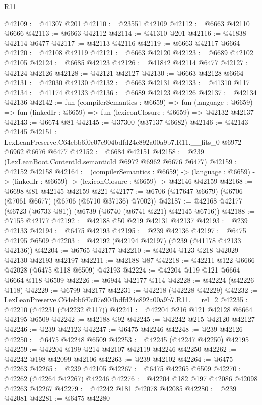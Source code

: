 \begin{lexlean}{R11}
\begin{coremodule}
@42109 := @41307 @201
@42110 := @23551 @42109
@42112 := @6663 @42110 @6666
@42113 := @6663 @42112
@42114 := @41310 @201
@42116 := @41838 @42114 @6477
@42117 := @42113 @42116
@42119 := @6663 @42117 @6664
@42120 := @42108 @42119
@42121 := @6663 @42120
@42123 := @6689 @42102 @42105
@42124 := @6685 @42123
@42126 := @41842 @42114 @6477
@42127 := @42124 @42126
@42128 := @42121 @42127
@42130 := @6663 @42128 @6664
@42131 := @42030 @42130
@42132 := @6663 @42131
@42133 := @41310 @117
@42134 := @41174 @42133
@42136 := @6689 @42123 @42126
@42137 := @42134 @42136
@42142 := fun (compilerSemantics : @6659) =>
  fun (language : @6659) => fun (linkedIr : @6659) => fun (lexiconClosure : @6659) => @42132 @42137
@42143 := @6674 @81
@42145 := @37300 (@37137 @6682)
@42146 := @42143 @42145
@42151 := LexLeanPreserve.C64ebb6f0c07e904bdfd24c892a00a9b7.R11.__fits_0 @6972 @6962 @6676 @6477
@42152 := @6684 @42151
@42158 := @239 (LexLeanBoot.ContentId.semanticId @6972 @6962 @6676 @6477)
@42159 := @42152 @42158
@42164 := (compilerSemantics : @6659) ->
  (language : @6659) -> (linkedIr : @6659) -> (lexiconClosure : @6659) -> @42146 @42159
@42168 := @6698 @81 @42145 @42159 @221
@42177 := @6706 (@17647 @6679) (@6706 (@7061 @6677) (@6706 (@6710 @37136) @7002))
@42187 := @42168 @42177 (@6723 (@6733 @81)) (@6739 (@6740 (@6741 @221) @42145 @6716))
@42188 := @7155 @42177
@42192 := @42188 @50 @219 @42131 @42137
@42193 := @239 @42133
@42194 := @6475 @42193
@42195 := @239 @42136
@42197 := @6475 @42195 @6509
@42203 := @42192 (@42194 @42197) (@239 (@41178 @42133 @42136))
@42204 := @6765 @42177
@42210 := @42204 @123 @218 @42029 @42130 @42193 @42197
@42211 := @42188 @87
@42218 := @42211 @122 @6666 @42028 (@6475 @118 @6509) @42193
@42224 := @42204 @119 @121 @6664 @6664 @118 @6509
@42226 := @6944 @42177 @114
@42228 := @42224 (@42226 @118)
@42229 := @6799 @42177
@42231 := @42218 (@42228 @42229)
@42232 := LexLeanPreserve.C64ebb6f0c07e904bdfd24c892a00a9b7.R11.__rel_2
@42235 := @42210 (@42231 (@42232 @117))
@42241 := @42204 @216 @121 @42128 @6664 @42195 @6509
@42242 := @42188 @92
@42245 := @42242 @215 @42120 @42127
@42246 := @239 @42123
@42247 := @6475 @42246
@42248 := @239 @42126
@42250 := @6475 @42248 @6509
@42253 := @42245 (@42247 @42250) @42195
@42259 := @42204 @199 @214 @42107 @42119 @42246 @42250
@42262 := @42242 @198 @42099 @42106
@42263 := @239 @42102
@42264 := @6475 @42263
@42265 := @239 @42105
@42267 := @6475 @42265 @6509
@42270 := @42262 (@42264 @42267) @42246
@42276 := @42204 @182 @197 @42086 @42098 @42263 @42267
@42279 := @42242 @181 @42078 @42085
@42280 := @239 @42081
@42281 := @6475 @42280

\end{coremodule}
\end{lexlean}
